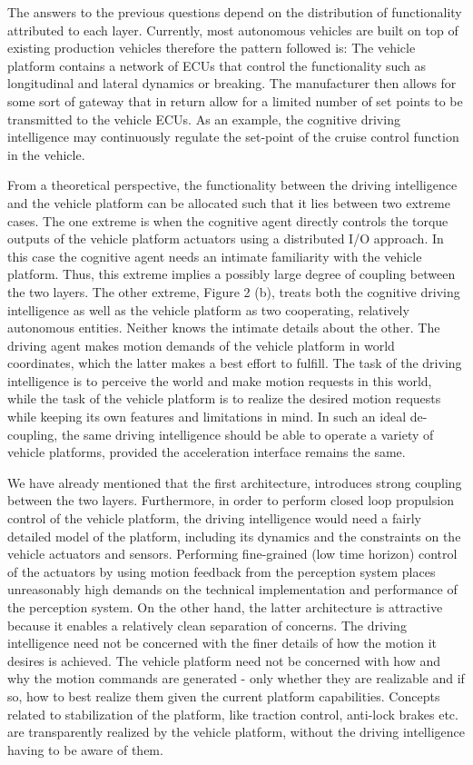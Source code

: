 The answers to the previous questions depend on the distribution of functionality attributed to each layer. Currently, most autonomous vehicles are built on top of existing production vehicles therefore the pattern followed is: The vehicle platform
contains a network of ECUs that control the functionality such as longitudinal and lateral dynamics or breaking. The manufacturer then allows for some sort of gateway that in return allow for a limited number of set points to be transmitted to the vehicle ECUs.  As an example, the cognitive driving intelligence may continuously regulate the set-point of the cruise control function in the vehicle.

From a theoretical perspective, the functionality  between the driving intelligence and the vehicle platform can be allocated such that it lies between two extreme cases. The one extreme is when the cognitive agent directly controls the torque outputs of the vehicle platform actuators using a distributed I/O approach. In this case the cognitive agent needs an intimate familiarity with the vehicle platform. Thus, this extreme implies a possibly large degree of coupling between the two layers. The other extreme, Figure 2 (b), treats both the cognitive
driving intelligence as well as the vehicle platform as two cooperating, relatively autonomous entities. Neither knows the intimate details about the other. The driving agent  makes motion demands of the vehicle platform in world coordinates, which the latter makes a best effort to fulfill. The task of the driving intelligence is to perceive the world and make motion requests in this world, while
the task of the vehicle platform is to realize the desired motion requests while keeping its own features and limitations in mind. In such an ideal de-coupling, the same driving intelligence should be able to operate a variety of vehicle platforms, provided the acceleration interface remains the
same.   

We have already mentioned that the first architecture, introduces strong coupling between the two layers. Furthermore, in order to perform closed loop propulsion control of the vehicle platform, the driving intelligence would need a fairly detailed model of the platform, including its dynamics and the constraints on the vehicle actuators and sensors. Performing fine-grained (low time horizon) control of the actuators by using motion feedback from the perception system places unreasonably high demands on the technical implementation and performance of the perception system. On the other hand, the latter architecture is attractive because it enables a relatively clean separation of concerns. The driving intelligence need not be concerned with the finer details of
how the motion it desires is achieved. The vehicle platform need not be concerned with how and why the motion commands are generated - only whether they are realizable and if so, how to best realize them given the current platform capabilities. Concepts related to stabilization of the platform,
like traction control, anti-lock brakes etc. are transparently realized by the vehicle platform, without the driving intelligence having to be aware of them.

